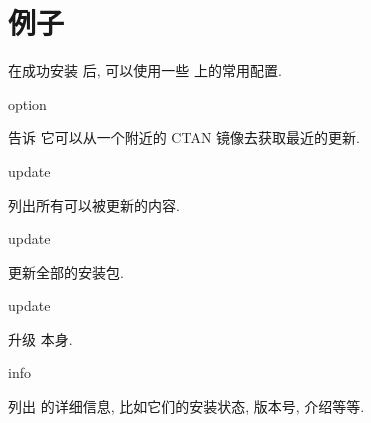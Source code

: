 
\section{例子}\label{sec:examples}

在成功安装 \tl 后, 可以使用一些 \tlmgr 上的常用配置. 

\begin{description}
    \item \tlmgr{} \ac{option}  \par
    告诉 \tlmgr 它可以从一个附近的 CTAN 镜像去获取最近的更新. 
    \item \tlmgr{} \ac{update} \par
    列出所有可以被更新的内容. 
    \item \tlmgr{} \ac{update} \par
    更新全部的安装包. 
    \item \tlmgr{} \ac{update} \par
    升级 \tlmgr 本身. 
    \item \tlmgr{} \ac{info} \par
    列出  的详细信息, 比如它们的安装状态, 版本号, 介绍等等. 
\end{description}


